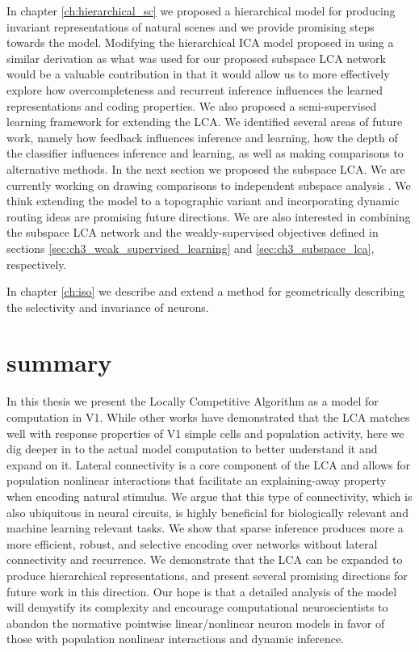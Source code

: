 In chapter \ref{ch:hierarchical_sc} we proposed a hierarchical model for producing invariant representations of natural scenes and we provide promising steps towards the model. Modifying the hierarchical ICA model proposed in \parencite{karklin2003learning} using a similar derivation as what was used for our proposed subspace LCA network would be a valuable contribution in that it would allow us to more effectively explore how overcompleteness and recurrent inference influences the learned representations and coding properties. We also proposed a semi-supervised learning framework for extending the LCA. We identified several areas of future work, namely how feedback influences inference and learning, how the depth of the classifier influences inference and learning, as well as making comparisons to alternative methods. In the next section we proposed the subspace LCA. We are currently working on drawing comparisons to independent subspace analysis \parencite{hyvarinen2000emergence}. We think extending the model to a topographic variant and incorporating dynamic routing ideas \parencite{olshausen1993neurobiological} are promising future directions. We are also interested in combining the subspace LCA network and the weakly-supervised objectives defined in sections \ref{sec:ch3_weak_supervised_learning} and \ref{sec:ch3_subspace_lca}, respectively.

In chapter \ref{ch:iso} we describe and extend a method for geometrically describing the selectivity and invariance of neurons.

\section{summary}\label{sec:ch5_summary}
In this thesis we present the Locally Competitive Algorithm as a model for computation in V1. While other works \parencite{zhu2013visual,olshausen1997sparse,vinje2000sparse} have demonstrated that the LCA matches well with response properties of V1 simple cells and population activity, here we dig deeper in to the actual model computation to better understand it and expand on it. Lateral connectivity is a core component of the LCA and allows for population nonlinear interactions that facilitate an explaining-away property when encoding natural stimulus. We argue that this type of connectivity, which is also ubiquitous in neural circuits, is highly beneficial for biologically relevant and machine learning relevant tasks. We show that sparse inference produces more a more efficient, robust, and selective encoding over networks without lateral connectivity and recurrence. We demonstrate that the LCA can be expanded to produce hierarchical representations, and present several promising directions for future work in this direction. Our hope is that a detailed analysis of the model will demystify its complexity and encourage computational neuroscientists to abandon the normative pointwise linear/nonlinear neuron models in favor of those with population nonlinear interactions and dynamic inference.